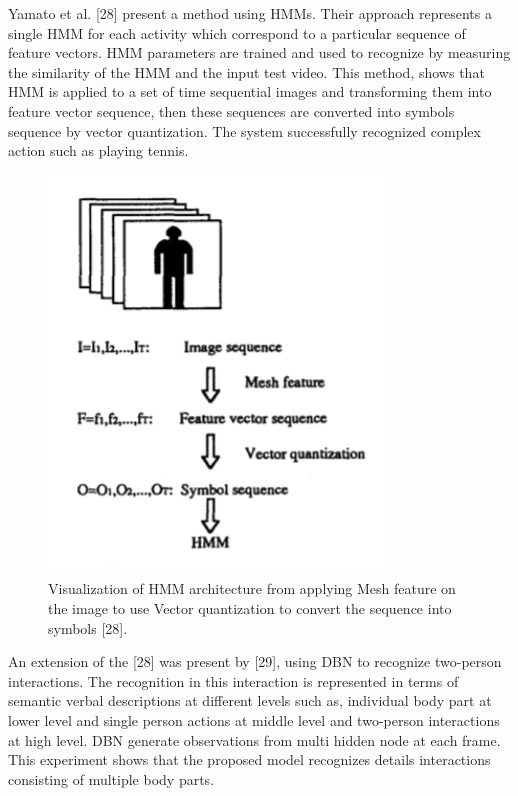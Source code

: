 Yamato et al. [28] present a method using HMMs. Their approach represents a single HMM for each activity which correspond to a particular sequence of feature vectors. HMM parameters are trained and used to recognize by measuring the similarity of the HMM and the input test video. This method, shows that HMM is applied to a set of time sequential images and transforming them into feature vector sequence, then these sequences are converted into symbols sequence by vector quantization. The system successfully recognized complex action such as playing tennis.\\

\begin{figure}[ht]
\centering
\includegraphics{Figures/qw}
\decoRule
\caption[Visualization of HMM architecture from applying Mesh feature on the image to use Vector quantization to convert the sequence into symbols "28".]{Visualization of HMM architecture from applying Mesh feature on the image to use Vector quantization to convert the sequence into symbols [28].}
\label{fig:la}
\end{figure}

An extension of the [28] was present by [29], using DBN to recognize two-person interactions. The recognition in this interaction is represented in terms of semantic verbal descriptions at different levels such as, individual body part at lower level and single person actions at middle level and two-person interactions at high level. DBN generate observations from multi hidden node at each frame. This experiment shows that the proposed model recognizes details interactions consisting of multiple body parts.\\

